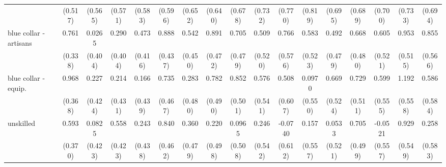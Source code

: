{\begin{tabular}{l*{16}{c}}
                    &     (0.517)         &     (0.565)         &     (0.571)         &     (0.583)         &     (0.596)         &     (0.652)         &     (0.640)         &     (0.678)         &     (0.732)         &     (0.770)         &     (0.819)         &     (0.695)         &     (0.689)         &     (0.700)         &     (0.733)         &     (0.694)         \\
[1em]
blue collar - artisans&       0.761\sym{*}  &      0.0265         &       0.290         &       0.473         &       0.888\sym{*}  &       0.542         &       0.891         &       0.705         &       0.509         &       0.766         &       0.583         &       0.492         &       0.668         &       0.605         &       0.953         &       0.855         \\
                    &     (0.338)         &     (0.404)         &     (0.404)         &     (0.416)         &     (0.437)         &     (0.450)         &     (0.472)         &     (0.479)         &     (0.520)         &     (0.576)         &     (0.523)         &     (0.479)         &     (0.480)         &     (0.521)         &     (0.515)         &     (0.566)         \\
[1em]
blue collar - equip.&       0.968\sym{**} &       0.227         &       0.214         &       0.166         &       0.735         &       0.283         &       0.782         &       0.852         &       0.576         &       0.508         &      0.0970         &       0.669         &       0.729         &       0.599         &       1.192\sym{*}  &       0.586         \\
                    &     (0.368)         &     (0.424)         &     (0.431)         &     (0.439)         &     (0.467)         &     (0.480)         &     (0.490)         &     (0.501)         &     (0.541)         &     (0.607)         &     (0.550)         &     (0.524)         &     (0.511)         &     (0.555)         &     (0.558)         &     (0.584)         \\
[1em]
unskilled           &       0.593         &      0.0825         &       0.558         &       0.243         &       0.840         &       0.360         &       0.220         &      0.0965         &       0.246         &     -0.0740         &       0.157         &      0.0533         &       0.705         &     -0.0521         &       0.929         &       0.258         \\
                    &     (0.370)         &     (0.423)         &     (0.423)         &     (0.438)         &     (0.462)         &     (0.479)         &     (0.498)         &     (0.508)         &     (0.542)         &     (0.612)         &     (0.557)         &     (0.521)         &     (0.499)         &     (0.557)         &     (0.549)         &     (0.583)         \\

\end{tabular}}
